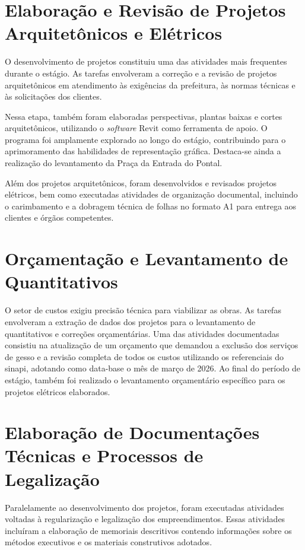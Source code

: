 \section{Elaboração e Revisão de Projetos Arquitetônicos e Elétricos}

O desenvolvimento de projetos constituiu uma das atividades mais frequentes durante o estágio. As tarefas envolveram a correção e a revisão de projetos arquitetônicos em atendimento às exigências da prefeitura, às normas técnicas e às solicitações dos clientes.

Nessa etapa, também foram elaboradas perspectivas, plantas baixas e cortes arquitetônicos, utilizando o \textit{software} Revit como ferramenta de apoio. O programa foi amplamente explorado ao longo do estágio, contribuindo para o aprimoramento das habilidades de representação gráfica. Destaca-se ainda a realização do levantamento da Praça da Entrada do Pontal.

Além dos projetos arquitetônicos, foram desenvolvidos e revisados projetos elétricos, bem como executadas atividades de organização documental, incluindo o carimbamento e a dobragem técnica de folhas no formato A1 para entrega aos clientes e órgãos competentes. 

\section{Orçamentação e Levantamento de Quantitativos}

O setor de custos exigiu precisão técnica para viabilizar as obras. As tarefas envolveram a extração de dados dos projetos para o levantamento de quantitativos e correções orçamentárias. Uma das atividades documentadas consistiu na atualização de um orçamento que demandou a exclusão dos serviços de gesso e a revisão completa de todos os custos utilizando os referenciais do \gls{sinapi}, adotando como data-base o mês de março de 2026. Ao final do período de estágio, também foi realizado o levantamento orçamentário específico para os projetos elétricos elaborados.

\section{Elaboração de Documentações Técnicas e Processos de Legalização}

Paralelamente ao desenvolvimento dos projetos, foram executadas atividades voltadas à regularização e legalização dos empreendimentos. Essas atividades incluíram a elaboração de memoriais descritivos contendo informações sobre os métodos executivos e os materiais construtivos adotados.

